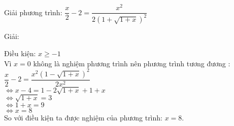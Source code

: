 \begin{vd}
Giải phương trình: $ \dfrac{x }{2} -2 = \dfrac{x^2}{2\left( 1+\sqrt{1+x }\right)^2} $
\end{vd}
\begin{center}
    Giải:
\end{center}

Điều kiện: $ x \geq -1  $ \\
Vì $x = 0$ không là nghiệm phương trình nên phương trình tương đương : \\
$ \dfrac{x }{2} -2 = \dfrac{x^2 \left( 1 -\sqrt{1+x }\right)^2}{2x^2} $\\
$ \Leftrightarrow  x -4 = 1 -2\sqrt{1+x } + 1+x $ \\
$ \Leftrightarrow        \sqrt{ 1+ x }  =3 $\\
$ \Leftrightarrow 1+x =9 $\\
$ \Leftrightarrow x = 8$\\
 So với điều kiện ta được nghiệm của phương trình: $ x=8 $.

